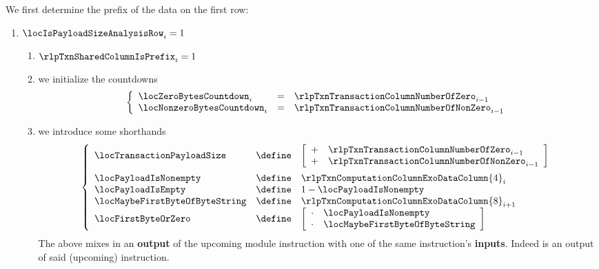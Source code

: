 We first determine the \rlp{} prefix of the data on the first row:
\begin{enumerate}[resume]
	\item \If $\locIsPayloadSizeAnalysisRow _{i} = 1$ \Then
		\begin{enumerate}
			\item $\rlpTxnSharedColumnIsPrefix _{i} = 1$
			\item we initialize the countdowns
				\[
					\left\{ \begin{array}{lcl}
						\locZeroBytesCountdown    _{i} & = & \rlpTxnTransactionColumnNumberOfZero    _{i - 1} \\
						\locNonzeroBytesCountdown _{i} & = & \rlpTxnTransactionColumnNumberOfNonZero _{i - 1} \\
					\end{array} \right.
				\]
			\item we introduce some shorthands
				\[
					\left\{ \begin{array}{lcl}
						\locTransactionPayloadSize & \define &
						\left[ \begin{array}{cl}
							+ & \rlpTxnTransactionColumnNumberOfZero    _{i - 1} \\
							+ & \rlpTxnTransactionColumnNumberOfNonZero _{i - 1} \\
						\end{array} \right]
						\vspace{2mm}
						\\
						\locPayloadIsNonempty          & \define & \rlpTxnComputationColumnExoDataColumn{4} _{i}      \\
						\locPayloadIsEmpty             & \define & 1 - \locPayloadIsNonempty   \\
						\locMaybeFirstByteOfByteString & \define & \rlpTxnComputationColumnExoDataColumn{8} _{i  + 1} \\
						\locFirstByteOrZero            & \define &
						\left[ \begin{array}{cl}
							\cdot & \locPayloadIsNonempty          \\
							\cdot & \locMaybeFirstByteOfByteString \\
						\end{array} \right]
					\end{array} \right.
				\]
				\saNote{}
				The above mixes in an \textbf{output} of the upcoming \rlpUtilsMod{} module instruction
				with one of the same instruction's \textbf{inputs}.
				Indeed \locPayloadIsNonempty{} is an output of said (upcoming) instruction.

\end{enumerate}
\end{enumerate}
